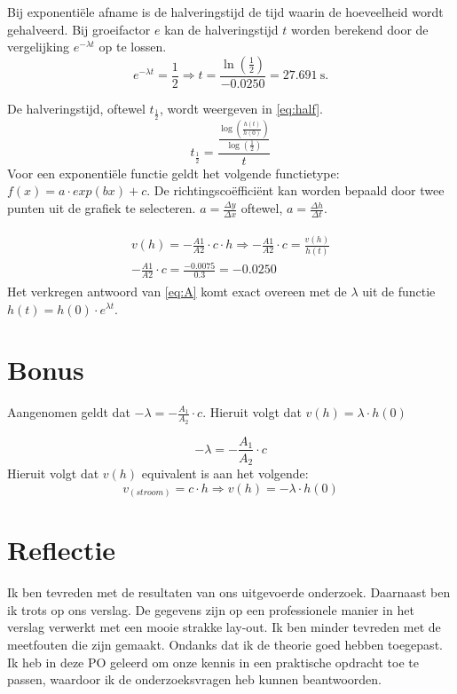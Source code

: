 \documentclass[numbers=endperiod]{scrartcl}
\begin{document}
Bij exponentiële afname is de halveringstijd de tijd waarin de hoeveelheid wordt gehalveerd. Bij groeifactor $e$ kan de halveringstijd $t$ worden berekend door de vergelijking $e^{-\lambda t}$ op te lossen.
\begin{equation}
e^{-\lambda t} = \frac{1}{2} \Rightarrow t =\frac{\ln(\frac{1}{2})}{-0.0250} = \SI{27.691}{\second}.
\end{equation}



De halveringstijd, oftewel $t_{\frac{1}{2}}$, wordt weergeven in \ref{eq:half}.
\begin{equation}\label{eq:half}
 t_{\frac{1}{2}}=\frac{\frac{\log\left(\frac{h(t)}{h(0)}\right)}{\log(\frac{1}{2})}}{t}
\end{equation}
Voor een exponentiële functie geldt het volgende functietype: $f(x) = a \cdot exp(bx)+c$. De richtingscoëfficiënt kan worden bepaald door twee punten uit de grafiek te selecteren. $a=\frac{\Delta y}{\Delta x}$ oftewel, $a=\frac{\Delta h}{\Delta t}$.  

\begin{align}\label{eq:A}
\begin{split}
v(h) = -\frac{A1}{A2} \cdot c \cdot h \Rightarrow -\frac{A1}{A2} \cdot c =\frac{v(h)}{h(t)}\\
-\frac{A1}{A2} \cdot c = \frac{-0.0075}{0.3} = -0.0250
\end{split}
\end{align}
Het verkregen antwoord van \ref{eq:A} komt exact overeen met de $\lambda$ uit de functie $h(t) = h(0)\cdot e^{\lambda t}$.

\newpage
\section{Bonus}
Aangenomen geldt dat $-\lambda = -\frac{A_1}{A_2} \cdot c$. Hieruit volgt dat $v(h) = \lambda \cdot h(0)$

\begin{equation}
-\lambda = -\frac{A_1}{A_2} \cdot c    
\end{equation}
Hieruit volgt dat $v(h)$ equivalent is aan het volgende:
\begin{equation}
v_{(stroom)} = c \cdot h \Rightarrow v(h) = -\lambda \cdot h(0)
\end{equation}

\newpage
\section{Reflectie}
Ik ben tevreden met de resultaten van ons uitgevoerde onderzoek. Daarnaast
ben ik trots op ons verslag. De gegevens zijn op een professionele
manier in het verslag verwerkt met een mooie strakke lay-out. Ik ben minder
tevreden met de meetfouten die zijn gemaakt. Ondanks dat ik de theorie
goed hebben toegepast. Ik heb in deze PO geleerd om onze kennis in
een praktische opdracht toe te passen, waardoor ik de onderzoeksvragen
heb kunnen beantwoorden.
\end{document}
